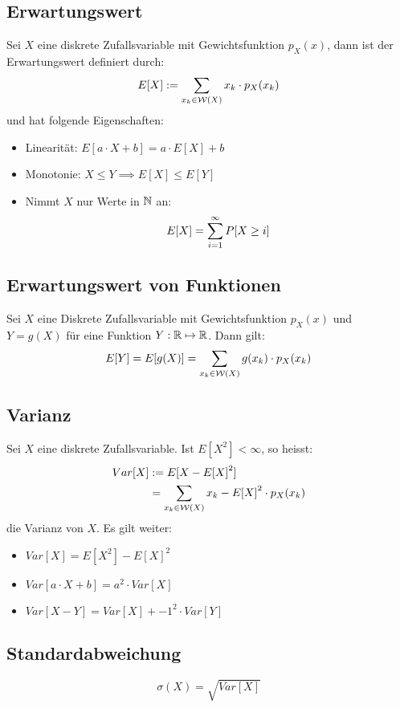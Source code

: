 \subsection*{Erwartungswert}
Sei $X$ eine diskrete Zufallsvariable mit Gewichtsfunktion $p_X (x)$, dann ist
der Erwartungswert definiert durch:
\begin{align*}
  E[X] := \sum_{x_k \in \mathcal{W} (X)} x_k \cdot p_X (x_k)
\end{align*}
und hat folgende Eigenschaften:
\begin{itemize}
  \item Linearität: $E[a \cdot X + b] = a \cdot E[X] + b$
  \item Monotonie: $X \leq Y \implies E[X] \leq E[Y]$
  \item Nimmt $X$ nur Werte in $\mathbb{N} $ an:
        \begin{align*}
          E[X] = \sum_{i = 1}^\infty P[X \geq i]
        \end{align*}
\end{itemize}
\subsection*{Erwartungswert von Funktionen}
Sei $X$ eine Diskrete Zufallsvariable mit Gewichtsfunktion $p_X (x)$ und $Y = g
  (X)$ für eine Funktion $Y: \mathbb{R} \mapsto \mathbb{R}$. Dann gilt:
\begin{align*}
  E[Y] = E[g (X)] = \sum_{x_k \in \mathcal{W} (X)} g (x_k) \cdot p_X (x_k)
\end{align*}
\subsection*{Varianz}
Sei $X$ eine diskrete Zufallsvariable. Ist $E[X^2] < \infty$, so heisst:
\begin{align*}
  Var[X] & := E[ {X - E[X]}^2]                                     \\
         & = \sum_{x_k \in \mathcal{W} (X)}  {x_k - E[X]}^2 \cdot p_X (x_k)
\end{align*}
die Varianz von $X$. Es gilt weiter:
\begin{itemize}
  \item $Var[X] = E[X^2] - {E[X]}^2$
  \item $Var[a \cdot X + b] = a^2 \cdot Var[X]$
  \item $Var[X - Y] = Var[X] +  {-1}^2 \cdot Var[Y]$
\end{itemize}
\subsection*{Standardabweichung}
$$
  \sigma (X) = \sqrt{Var[X]}
$$
